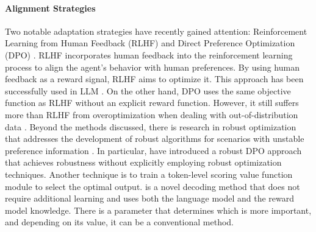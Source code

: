 \paragraph{Alignment Strategies}
Two notable adaptation strategies have recently gained attention: Reinforcement Learning from Human Feedback (RLHF) and Direct Preference Optimization (DPO) \citep{stiennon2020,NEURIPS2023_a85b405e}.
RLHF incorporates human feedback into the reinforcement learning process to align the agent's behavior with human preferences. By using human feedback as a reward signal, RLHF aims to optimize it. This approach has been successfully used in LLM \citep{NEURIPS2022_b1efde53}. 
On the other hand, DPO uses the same objective function as RLHF without an explicit reward function. However, it still suffers more than RLHF from overoptimization when dealing with out-of-distribution data \citep{xu2024is}. Beyond the methods discussed, there is research in robust optimization that addresses the development of robust algorithms for scenarios with unstable preference information \citep{wu2024towards}. In particular, \cite{chowdhury2024provably} have introduced a robust DPO approach that achieves robustness without explicitly employing robust optimization techniques.
Another technique \citep{mudgal2024controlled} is to train a token-level scoring value function module to select the optimal output.
\cite{khanov2024args} is a novel decoding method that does not require additional learning and uses both the language model and the reward model knowledge. There is a parameter that determines which is more important, and depending on its value, it can be a conventional method.
